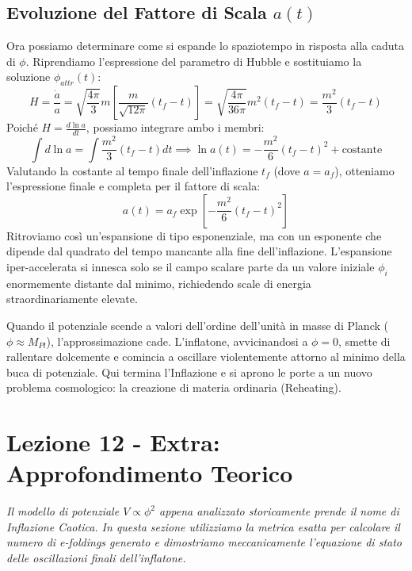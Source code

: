 \documentclass[11pt,a4paper]{report}
\begin{document}
\subsection{Evoluzione del Fattore di Scala $a(t)$}
Ora possiamo determinare come si espande lo spaziotempo in risposta alla caduta di $\phi$. Riprendiamo l'espressione del parametro di Hubble e sostituiamo la soluzione $\phi_{attr}(t)$:
\begin{equation}
H = \frac{\dot{a}}{a} = \sqrt{\frac{4\pi}{3}} m \left[ \frac{m}{\sqrt{12\pi}} (t_f - t) \right] = \sqrt{\frac{4\pi}{36\pi}} m^2 (t_f - t) = \frac{m^2}{3} (t_f - t)
\end{equation}
Poiché $H = \frac{d\ln a}{dt}$, possiamo integrare ambo i membri:
\begin{equation}
\int d\ln a = \int \frac{m^2}{3} (t_f - t) dt \implies \ln a(t) = -\frac{m^2}{6} (t_f - t)^2 + \text{costante}
\end{equation}
Valutando la costante al tempo finale dell'inflazione $t_f$ (dove $a = a_f$), otteniamo l'espressione finale e completa per il fattore di scala:
\begin{equation}
a(t) = a_f \exp\left[ -\frac{m^2}{6} (t_f - t)^2 \right]
\end{equation}
Ritroviamo così un'espansione di tipo esponenziale, ma con un esponente che dipende dal quadrato del tempo mancante alla fine dell'inflazione. L'espansione iper-accelerata si innesca solo se il campo scalare parte da un valore iniziale $\phi_i$ enormemente distante dal minimo, richiedendo scale di energia straordinariamente elevate.

Quando il potenziale scende a valori dell'ordine dell'unità in masse di Planck ($\phi \approx M_{Pl}$), l'approssimazione cade. L'inflatone, avvicinandosi a $\phi = 0$, smette di rallentare dolcemente e comincia a oscillare violentemente attorno al minimo della buca di potenziale. Qui termina l'Inflazione e si aprono le porte a un nuovo problema cosmologico: la creazione di materia ordinaria (Reheating).

\newpage
\section{Lezione 12 - Extra: Approfondimento Teorico}

\textit{Il modello di potenziale $V \propto \phi^2$ appena analizzato storicamente prende il nome di Inflazione Caotica. In questa sezione utilizziamo la metrica esatta per calcolare il numero di e-foldings generato e dimostriamo meccanicamente l'equazione di stato delle oscillazioni finali dell'inflatone.}
\end{document}
